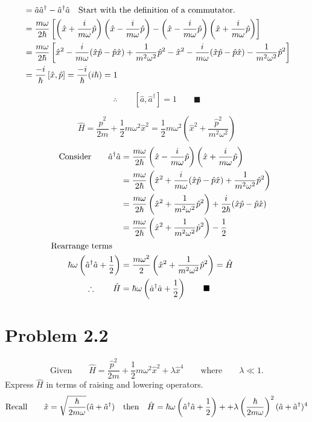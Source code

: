 \documentclass{amsart}
\begin{document}
\begin{align*}
    [\hat{a},\hat{a}^\dagger] &= \hat{a}\hat{a}^\dagger-\hat{a}^\dagger\hat{a}\qq{Start with the definition of a commutator.}\\
    &= \frac{m\omega}{2\hbar}\left[\left(\hat{x} + \frac{i}{m\omega}\hat{p}\right)\left(\hat{x} - \frac{i}{m\omega}\hat{p}\right)-\left(\hat{x} - \frac{i}{m\omega}\hat{p}\right)\left(\hat{x} + \frac{i}{m\omega}\hat{p}\right)\right]\\
    &= \frac{m\omega}{2\hbar}\left[\hat{x}^2 - \frac{i}{m\omega}(\hat{x}\hat{p}-\hat{p}\hat{x}) + \frac{1}{m^2\omega^2}\hat{p}^2-\hat{x}^2 - \frac{i}{m\omega}(\hat{x}\hat{p}-\hat{p}\hat{x}) - \frac{1}{m^2\omega^2}\hat{p}^2\right]\\
    &= \frac{-i}{\hbar}\left[ \hat{x},\hat{p}\right]= \frac{-i}{\hbar} (i\hbar)=1\\
\end{align*}  

  \[\therefore\qquad[\hat{a},\hat{a}^\dagger] =1 \qquad\blacksquare\]
  
\pagebreak


\[\hat{H}=\frac{\hat{p}^2}{2m}+\frac{1}{2}m\omega^2\hat{x}^2=\frac{1}{2}m\omega^2\left(\hat{x}^2+\frac{\hat{p}^2}{m^2\omega^2}\right) \]
\begin{align*}
    \text{Consider}\qquad \hat{a}^\dagger \hat{a} &=\frac{m\omega}{2\hbar}\left(\hat{x} - \frac{i}{m\omega}\hat{p}\right)\left(\hat{x} + \frac{i}{m\omega}\hat{p}\right)\\
    &=\frac{m\omega}{2\hbar}\left(\hat{x}^2 + \frac{i}{m\omega}(\hat{x}\hat{p}-\hat{p}\hat{x}) + \frac{1}{m^2\omega^2}\hat{p}^2\right)\\
    &=\frac{m\omega}{2\hbar}\left(\hat{x}^2 + \frac{1}{m^2\omega^2}\hat{p}^2\right) + \frac{i}{2\hbar}(\hat{x}\hat{p}-\hat{p}\hat{x})\\
    &=\frac{m\omega}{2\hbar}\left(\hat{x}^2 + \frac{1}{m^2\omega^2}\hat{p}^2\right) - \frac{1}{2}\\
    \qq{Rearrange terms}\\
    \hbar\omega\left(\hat{a}^\dagger \hat{a} +\frac{1}{2}\right)&=\frac{m\omega^2}{2}\left(\hat{x}^2 + \frac{1}{m^2\omega^2}\hat{p}^2\right)= \hat{H}\\
    \therefore\qquad\hat{H}&=\hbar\omega\left(\hat{a}^\dagger \hat{a} +\frac{1}{2}\right)\qquad\blacksquare
\end{align*}

\section*{Problem 2.2}
\[\text{Given}\qquad\hat{H}=\frac{\hat{p}^2}{2m}+\frac{1}{2}m\omega^2\hat{x}^2+\lambda\hat{x}^4\qquad\text{where}\qquad \lambda\ll 1. \]
Express $\hat{H}$ in terms of raising and lowering operators.
\[\text{Recall}\qquad\hat{x}=\sqrt{\frac{\hbar}{2m\omega}}(\hat{a}+\hat{a}^\dagger)\qq{then}\hat{H}=\hbar\omega\left(\hat{a}^\dagger \hat{a} +\frac{1}{2}\right)++\lambda\left(\frac{\hbar}{2m\omega}\right)^2(\hat{a}+\hat{a}^\dagger)^4   \]
\end{document}
